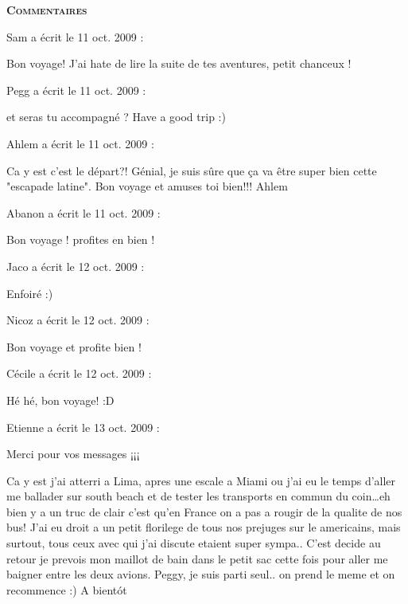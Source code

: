 \bigskip
\textbf{\textsc{Commentaires}}

\medskip
Sam a écrit le 11 oct. 2009 :
\begin{displayquote}
Bon voyage! J'ai hate de lire la suite de tes aventures, petit chanceux !
\end{displayquote}

\medskip
Pegg a écrit le 11 oct. 2009 :
\begin{displayquote}
et seras tu accompagné ? Have a good trip :)
\end{displayquote}

\medskip
Ahlem a écrit le 11 oct. 2009 :
\begin{displayquote}
Ca y est c'est le départ?!
Génial, je suis sûre que ça va être super bien cette "escapade latine".
Bon voyage et amuses toi bien!!!
Ahlem
\end{displayquote}

\medskip
Abanon a écrit le 11 oct. 2009 :
\begin{displayquote}
Bon voyage ! profites en bien !
\end{displayquote}

\medskip
Jaco a écrit le 12 oct. 2009 :
\begin{displayquote}
Enfoiré :)
\end{displayquote}

\medskip
Nicoz a écrit le 12 oct. 2009 :
\begin{displayquote}
Bon voyage et profite bien !
\end{displayquote}

\medskip
Cécile a écrit le 12 oct. 2009 :
\begin{displayquote}
Hé hé, bon voyage! :D
\end{displayquote}

\medskip
Etienne a écrit le 13 oct. 2009 :
\begin{displayquote}
Merci pour vos messages ¡¡¡

Ca y est j'ai atterri a Lima, apres une escale a Miami ou j'ai eu le temps d'aller me ballader sur south beach et de tester les transports en commun du coin\dots eh bien y a un truc de clair c'est qu'en France on a pas a rougir de la qualite de nos bus! J'ai eu droit a un petit florilege de tous nos prejuges sur le americains, mais surtout, tous ceux avec qui j'ai discute etaient super sympa..
C'est decide au retour je prevois mon maillot de bain dans le petit sac cette fois pour aller me baigner entre les deux avions.
Peggy, je suis parti seul.. on prend le meme et on recommence :)
A bientót
\end{displayquote}

